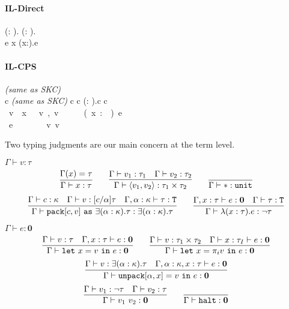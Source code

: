 \paragraph{IL-Direct}
\begin{bnf}
  \tau \bnfeq
  \alpha
  \alt \tau \rightarrow \tau
  \alt \forall(\alpha : \kappa). \tau
  \alt \tau \times \tau
  \alt \exists(\alpha : \kappa).\tau\\
  e \bnfeq x \alt \lambda(x:\tau).e \alt \cdots
\end{bnf}

\paragraph{IL-CPS}
\begin{bnf}
  \kappa \bnfeq \textit{(same as SKC)}\\
  c \bnfeq \textit{(same as SKC)}
  \alt c \times c
  \alt \exists(\alpha : \kappa).c
  \alt \neg c
  \alt \unit\\
  v \bnfeq x \alt \langle v, v \rangle \alt
    \alt \lambda(x : \tau).e \alt \ast\\
  e \bnfeq
    \alt {}
    \alt {}
    \alt v~v
    \alt \halt
\end{bnf}

Two typing judgments are our main concern at the term level.

\begin{judgment}
  $\Gamma \vdash v : \tau$
  \[
    \infer{\Gamma \vdash x : \tau}{\Gamma(x) = \tau}
    \qquad
    \infer{\Gamma \vdash \langle v_1, v_2 \rangle : \tau_1 \times \tau_2}
      {\Gamma \vdash v_1 : \tau_1
      &\Gamma \vdash v_2 : \tau_2
      }
    \qquad
    \infer{\Gamma \vdash \ast : \unit}{}
  \]
  \[
    \infer{\Gamma \vdash \pack{c}{v}{\exists(\alpha : \kappa).\tau}
      : \exists(\alpha : \kappa).\tau}
      {\Gamma \vdash c : \kappa
      &\Gamma \vdash v : [c/\alpha]\tau
      &\Gamma, \alpha : \kappa \vdash \tau : \T
      }
      \qquad
    \infer{\Gamma \vdash \lambda(x : \tau).e : \neg \tau}
      {\Gamma, x : \tau \vdash e : \mathbf 0
      &\Gamma \vdash \tau : \T
      }
  \]
\end{judgment}

\begin{judgment}
  $\Gamma \vdash e : \mathbf 0$
  \[
    \infer{\Gamma \vdash \letv x v e : \mathbf{0}}
      {\Gamma \vdash v : \tau
      &\Gamma, x : \tau \vdash e : \mathbf 0
      }
    \qquad
    \infer
      {\Gamma \vdash \letv x {\pi_i v} e: \mathbf 0}
      {\Gamma \vdash v : \tau_1 \times \tau_2
      &\Gamma \vdash x : \tau_I \vdash e : \mathbf 0
      }
  \]
  \[
    \infer
      {\Gamma \vdash \unpack \alpha x v e : \mathbf 0}
      {\Gamma \vdash v : \exists (\alpha : \kappa).\tau
      &\Gamma, \alpha : \kappa, x : \tau \vdash e : \mathbf{0}
      }
  \]
  \[
    \infer
      {\Gamma \vdash v_1~v_2 : \mathbf{0}}
      {\Gamma \vdash v_1 : \neg \tau
      & \Gamma \vdash v_2 : \tau
      }
    \qquad
    \infer{\Gamma \vdash \halt : \mathbf{0}}{}
  \]
\end{judgment}

